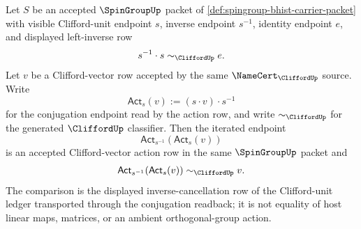 \begin{theorem}
\label{thm:spingroup-conjugation-action-inverse-involution-law}
Let $S$ be an accepted $\SpinGroupUp$ packet of
\autoref{def:spingroup-bhist-carrier-packet} with visible Clifford-unit
endpoint $s$, inverse endpoint $s^{-1}$, identity endpoint $e$, and displayed
left-inverse row
$$
s^{-1}\cdot s\sim_{\CliffordUp}e.
$$
Let $v$ be a Clifford-vector row accepted by the same
$\NameCert_{\CliffordUp}$ source. Write
$$
\mathsf{Act}_{s}(v):=(s\cdot v)\cdot s^{-1}
$$
for the conjugation endpoint read by the action row, and write
$\sim_{\CliffordUp}$ for the generated $\CliffordUp$ classifier. Then the
iterated endpoint
$$
\mathsf{Act}_{s^{-1}}(\mathsf{Act}_{s}(v))
$$
is an accepted Clifford-vector action row in the same $\SpinGroupUp$ packet and
$$
\mathsf{Act}_{s^{-1}}(\mathsf{Act}_{s}(v))\sim_{\CliffordUp}v.
$$
The comparison is the displayed inverse-cancellation row of the Clifford-unit
ledger transported through the conjugation readback; it is not equality of host
linear maps, matrices, or an ambient orthogonal-group action.
\end{theorem}
